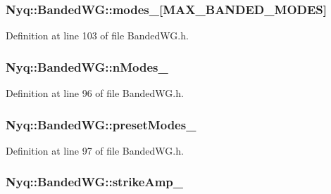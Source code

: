 \subsubsection[{\texorpdfstring{modes\+\_\+}{modes_}}]{ Nyq\+::\+Banded\+W\+G\+::modes\+\_\+\mbox{[}{\bf M\+A\+X\+\_\+\+B\+A\+N\+D\+E\+D\+\_\+\+M\+O\+D\+ES}\mbox{]}\hspace{0.3cm}{\ttfamily [protected]}}\hypertarget{class_nyq_1_1_banded_w_g_a7052255bbc2cc61b6ab5257415aac1da}{}\label{class_nyq_1_1_banded_w_g_a7052255bbc2cc61b6ab5257415aac1da}


Definition at line 103 of file Banded\+W\+G.\+h.

\subsubsection[{\texorpdfstring{n\+Modes\+\_\+}{nModes_}}]{ Nyq\+::\+Banded\+W\+G\+::n\+Modes\+\_\+\hspace{0.3cm}{\ttfamily [protected]}}\hypertarget{class_nyq_1_1_banded_w_g_ab0cf576013d5ef3ef211ad6f2773ac8c}{}\label{class_nyq_1_1_banded_w_g_ab0cf576013d5ef3ef211ad6f2773ac8c}


Definition at line 96 of file Banded\+W\+G.\+h.

\subsubsection[{\texorpdfstring{preset\+Modes\+\_\+}{presetModes_}}]{ Nyq\+::\+Banded\+W\+G\+::preset\+Modes\+\_\+\hspace{0.3cm}{\ttfamily [protected]}}\hypertarget{class_nyq_1_1_banded_w_g_aa7f02c8ef5e1e3a7091552b2ff9cd125}{}\label{class_nyq_1_1_banded_w_g_aa7f02c8ef5e1e3a7091552b2ff9cd125}


Definition at line 97 of file Banded\+W\+G.\+h.

\subsubsection[{\texorpdfstring{strike\+Amp\+\_\+}{strikeAmp_}}]{ Nyq\+::\+Banded\+W\+G\+::strike\+Amp\+\_\+\hspace{0.3cm}{\ttfamily [protected]}}\hypertarget{class_nyq_1_1_banded_w_g_a868b3c2d2cd187b0da7b7f4af7d8420c}{}\label{class_nyq_1_1_banded_w_g_a868b3c2d2cd187b0da7b7f4af7d8420c}


